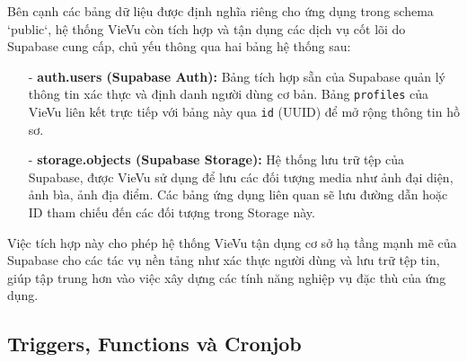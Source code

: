 Bên cạnh các bảng dữ liệu được định nghĩa riêng cho ứng dụng trong schema `public`, hệ thống VieVu còn tích hợp và tận dụng các dịch vụ cốt lõi do Supabase cung cấp, chủ yếu thông qua hai bảng hệ thống sau:
\begin{itemize}
    \item[-]\textbf{auth.users (Supabase Auth):} Bảng tích hợp sẵn của Supabase quản lý thông tin xác thực và định danh người dùng cơ bản. Bảng \texttt{profiles} của VieVu liên kết trực tiếp với bảng này qua \texttt{id} (UUID) để mở rộng thông tin hồ sơ.

    \item[-]\textbf{storage.objects (Supabase Storage):} Hệ thống lưu trữ tệp của Supabase, được VieVu sử dụng để lưu các đối tượng media như ảnh đại diện, ảnh bìa, ảnh địa điểm. Các bảng ứng dụng liên quan sẽ lưu đường dẫn hoặc ID tham chiếu đến các đối tượng trong Storage này.


\end{itemize}
Việc tích hợp này cho phép hệ thống VieVu tận dụng cơ sở hạ tầng mạnh mẽ của Supabase cho các tác vụ nền tảng như xác thực người dùng và lưu trữ tệp tin, giúp tập trung hơn vào việc xây dựng các tính năng nghiệp vụ đặc thù của ứng dụng.

\subsection{Triggers, Functions và Cronjob}

